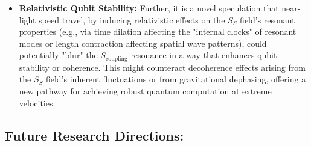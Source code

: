 \documentclass[11pt,a4paper]{article} %
\newcommand{\SSp}{S_S} %
\newcommand{\Scoupling}{S_{\text{coupling}}}
\begin{document}
\begin{itemize}
    \item \textbf{Relativistic Qubit Stability:} Further, it is a novel speculation that near-light speed travel, by inducing relativistic effects on the $\SSp$ field's resonant properties (e.g., via time dilation affecting the "internal clocks" of resonant modes or length contraction affecting spatial wave patterns), could potentially "blur" the $\Scoupling$ resonance in a way that enhances qubit stability or coherence. This might counteract decoherence effects arising from the $\SSp$ field's inherent fluctuations or from gravitational dephasing, offering a new pathway for achieving robust quantum computation at extreme velocities.
\end{itemize}

\subsection{Future Research Directions:}
\end{document}
